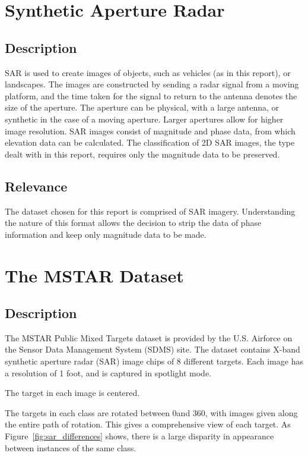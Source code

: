\section{Synthetic Aperture Radar}
\subsection{Description}
SAR is used to create images of objects, such as vehicles (as in this report), or landscapes. The images are constructed by sending a radar signal from a moving platform, and the time taken for the signal to return to the antenna denotes the size of the aperture. The aperture can be physical, with a large antenna, or synthetic in the case of a moving aperture. Larger apertures allow for higher image resolution. SAR images consist of magnitude and phase data, from which elevation data can be calculated. \cite{curlander1991synthetic} The classification of 2D SAR images, the type dealt with in this report, requires only the magnitude data to be preserved.
\subsection{Relevance}
The dataset chosen for this report is comprised of SAR imagery. Understanding the nature of this format allows the decision to strip the data of phase information and keep only magnitude data to be made. 

\section{The MSTAR Dataset}
\subsection{Description}
The MSTAR Public Mixed Targets dataset is provided by the U.S. Airforce on the Sensor Data Management System (SDMS) site\cite{MSTAR}. The dataset contains X-band synthetic aperture radar (SAR) image chips of 8 different targets. Each image has a resolution of 1 foot, and is captured in spotlight mode. 

The target in each image is centered.

The targets in each class are rotated between 0\degree and 360\degree, with images given along the entire path of rotation. This gives a comprehensive view of each target. As Figure~\ref{fig:sar_differences} shows, there is a large disparity in appearance between instances of the same class.

